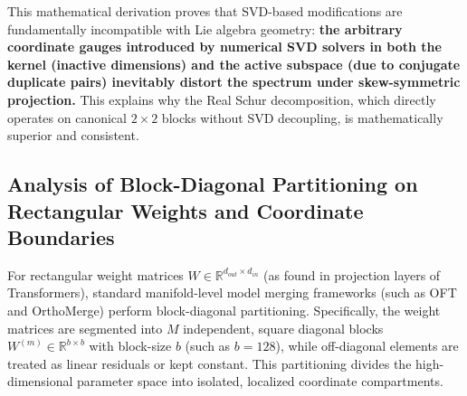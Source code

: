 This mathematical derivation proves that SVD-based modifications are fundamentally incompatible with Lie algebra geometry: \textbf{the arbitrary coordinate gauges introduced by numerical SVD solvers in both the kernel (inactive dimensions) and the active subspace (due to conjugate duplicate pairs) inevitably distort the spectrum under skew-symmetric projection.} This explains why the Real Schur decomposition, which directly operates on canonical $2\times 2$ blocks without SVD decoupling, is mathematically superior and consistent.

\subsection{Analysis of Block-Diagonal Partitioning on Rectangular Weights and Coordinate Boundaries}
\label{subsec:rectangular_boundaries}

For rectangular weight matrices $W \in \mathbb{R}^{d_{out} \times d_{in}}$ (as found in projection layers of Transformers), standard manifold-level model merging frameworks (such as OFT and OrthoMerge) perform block-diagonal partitioning. Specifically, the weight matrices are segmented into $M$ independent, square diagonal blocks $W^{(m)} \in \mathbb{R}^{b \times b}$ with block-size $b$ (such as $b=128$), while off-diagonal elements are treated as linear residuals or kept constant. This partitioning divides the high-dimensional parameter space into isolated, localized coordinate compartments.

